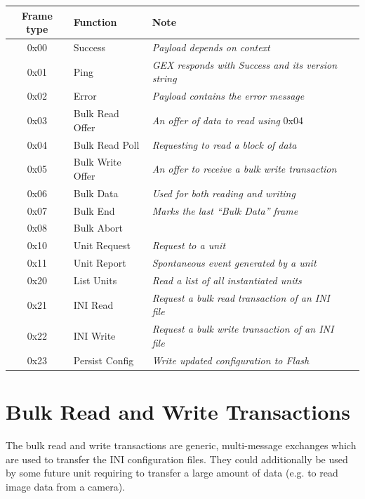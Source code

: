 \begin{table}[h]
	\centering
	\begin{tabular}{clll}
		\toprule
		\textbf{Frame type} & \textbf{Function} & \textbf{Note} \\
		\midrule
		0x00 & Success & \textit{Payload depends on context} \\
		0x01 & Ping & \textit{GEX responds with Success and its version string} \\
		0x02 & Error & \textit{Payload contains the error message} \\
		\midrule
		0x03 & Bulk Read Offer & \textit{An offer of data to read using }0x04 \\
		0x04 & Bulk Read Poll & \textit{Requesting to read a block of data} \\
		0x05 & Bulk Write Offer & \textit{An offer to receive a bulk write transaction} \\
		0x06 & Bulk Data & \textit{Used for both reading and writing} \\
		0x07 & Bulk End & \textit{Marks the last ``Bulk Data'' frame} \\
		0x08 & Bulk Abort & \textit{} \\
		\midrule
		0x10 & Unit Request & \textit{Request to a unit} \\
		0x11 & Unit Report & \textit{Spontaneous event generated by a unit} \\
		\midrule
		0x20 & List Units & \textit{Read a list of all instantiated units} \\
		0x21 & INI Read & \textit{Request a bulk read transaction of an INI file} \\
		0x22 & INI Write & \textit{Request a bulk write transaction of an INI file} \\
		0x23 & Persist Config & \textit{Write updated configuration to Flash} \\
		\bottomrule
	\end{tabular}
\end{table}


\section{Bulk Read and Write Transactions}

The bulk read and write transactions are generic, multi-message exchanges which are used to transfer the INI configuration files. They could additionally be used by some future unit requiring to transfer a large amount of data (e.g. to read image data from a camera).

